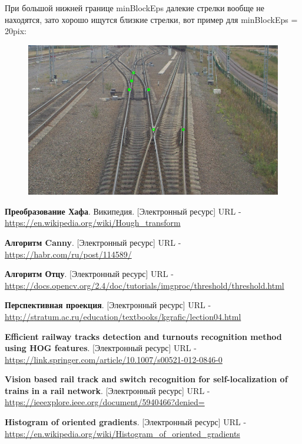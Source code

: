 При большой нижней границе minBlockEps далекие стрелки вообще не находятся, зато хорошо ищутся близкие стрелки, вот пример для minBlockEps = 20pix:
\begin{figure}[!h]
	\centering
	\includegraphics[width=0.7\linewidth]{pictures/45_20.png}
	\caption[Y - обратное]{}
	\label{fig:45_20}
\end{figure}


\newpage
{}

\begin{thebibliography}{2}
	\textbf{Преобразование Хафа}. Википедия. [Электронный ресурс] URL - 
	\href{https://en.wikipedia.org/wiki/Hough\_transform}{https://en.wikipedia.org/wiki/Hough\_transform}
	
	\textbf{Алгоритм Canny}. [Электронный ресурс] URL - 
	\href{https://habr.com/ru/post/114589/}{https://habr.com/ru/post/114589/}
	
	\textbf{Алгоритм Отцу}. [Электронный ресурс] URL - 
	\href{https://docs.opencv.org/2.4/doc/tutorials/imgproc/threshold/threshold.html}{https://docs.opencv.org/2.4/doc/tutorials/imgproc/threshold/threshold.html}
	
	\textbf{Перспективная проекция}. [Электронный ресурс] URL - 
	\href{http://stratum.ac.ru/education/textbooks/kgrafic/lection04.html}{http://stratum.ac.ru/education/textbooks/kgrafic/lection04.html}
	
	\textbf{Efficient railway tracks detection and turnouts recognition method using HOG features}. [Электронный ресурс] URL - 
	\href{https://link.springer.com/article/10.1007/s00521-012-0846-0}{https://link.springer.com/article/10.1007/s00521-012-0846-0}
	
	\textbf{Vision based rail track and switch recognition for self-localization of trains in a rail network}. [Электронный ресурс] URL - 
	\href{https://ieeexplore.ieee.org/document/5940466?denied=}{https://ieeexplore.ieee.org/document/5940466?denied=}
	
	\textbf{Histogram of oriented gradients}. [Электронный ресурс] URL - 
	\href{https://en.wikipedia.org/wiki/Histogram_of_oriented_gradients}{https://en.wikipedia.org/wiki/Histogram\_of\_oriented\_gradients}
	
\end{thebibliography}		  		 		